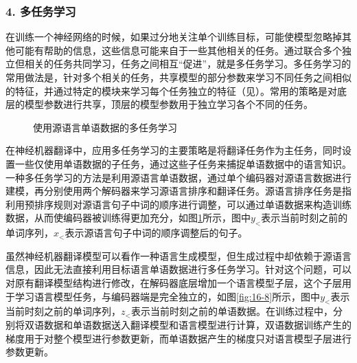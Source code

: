 \subsubsection{4. 多任务学习}

\parinterval 在训练一个神经网络的时候，如果过分地关注单个训练目标，可能使模型忽略掉其他可能有帮助的信息，这些信息可能来自于一些其他相关的任务。通过联合多个独立但相关的任务共同学习，任务之间相互``促进''，就是多任务学习。多任务学习的常用做法是，针对多个相关的任务，共享模型的部分参数来学习不同任务之间相似的特征，并通过特定的模块来学习每个任务独立的特征（见\chapterfifteen）。常用的策略是对底层的模型参数进行共享，顶层的模型参数用于独立学习各个不同的任务。

\begin{figure}[htp]
    \centering
    
    \caption{使用源语言单语数据的多任务学习}
    \label{fig:16-7}
\end{figure}

\parinterval 在神经机器翻译中，应用多任务学习的主要策略是将翻译任务作为主任务，同时设置一些仅使用单语数据的子任务，通过这些子任务来捕捉单语数据中的语言知识。一种多任务学习的方法是利用源语言单语数据，通过单个编码器对源语言数据进行建模，再分别使用两个解码器来学习源语言排序和翻译任务。源语言排序任务是指利用预排序规则对源语言句子中词的顺序进行调整，可以通过单语数据来构造训练数据，从而使编码器被训练得更加充分，如图\ref{fig:16-7}所示，图中$y_{<}$表示当前时刻之前的单词序列，$x_{<}$表示源语言句子中词的顺序调整后的句子。

\parinterval 虽然神经机器翻译模型可以看作一种语言生成模型，但生成过程中却依赖于源语言信息，因此无法直接利用目标语言单语数据进行多任务学习。针对这个问题，可以对原有翻译模型结构进行修改，在解码器底层增加一个语言模型子层，这个子层用于学习语言模型任务，与编码器端是完全独立的，如图\ref{fig:16-8}所示，图中$y_{<}$表示当前时刻之前的单词序列，$z_{<}$表示当前时刻之前的单语数据。在训练过程中，分别将双语数据和单语数据送入翻译模型和语言模型进行计算，双语数据训练产生的梯度用于对整个模型进行参数更新，而单语数据产生的梯度只对语言模型子层进行参数更新。

